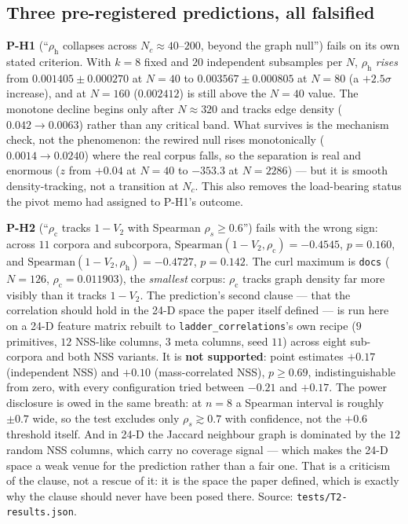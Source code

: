 \documentclass[11pt,a4paper]{article}
\theoremstyle{plain}
\theoremstyle{remark}
\theoremstyle{plain}
\begin{document}
\subsection{Three pre-registered predictions, all falsified}

\textbf{P-H1} (``$\rho_{\mathrm h}$ collapses across $N_c\approx40$--$200$, beyond the graph null'') fails on its own stated criterion. With $k=8$ fixed and $20$ independent subsamples per $N$, $\rho_{\mathrm h}$ \emph{rises} from $0.001405\pm0.000270$ at $N=40$ to $0.003567\pm0.000805$ at $N=80$ (a $+2.5\sigma$ increase), and at $N=160$ ($0.002412$) is still above the $N=40$ value. The monotone decline begins only after $N\approx320$ and tracks edge density ($0.042\to0.0063$) rather than any critical band. What survives is the mechanism check, not the phenomenon: the rewired null rises monotonically ($0.0014\to0.0240$) where the real corpus falls, so the separation is real and enormous ($z$ from $+0.04$ at $N=40$ to $-353.3$ at $N=2286$) --- but it is smooth density-tracking, not a transition at $N_c$. This also removes the load-bearing status the pivot memo had assigned to P-H1's outcome.

\textbf{P-H2} (``$\rho_{\mathrm c}$ tracks $1-V_2$ with Spearman $\rho_s\ge0.6$'') fails with the wrong sign: across $11$ corpora and subcorpora, $\mathrm{Spearman}(1-V_2,\rho_{\mathrm c})=-0.4545$, $p=0.160$, and $\mathrm{Spearman}(1-V_2,\rho_{\mathrm h})=-0.4727$, $p=0.142$. The curl maximum is \texttt{docs} ($N=126$, $\rho_{\mathrm c}=0.011903$), the \emph{smallest} corpus: $\rho_{\mathrm c}$ tracks graph density far more visibly than it tracks $1-V_2$. The prediction's second clause --- that the correlation should hold in the 24-D space the paper itself defined --- is run here on a 24-D feature matrix rebuilt to \texttt{ladder\_correlations}'s own recipe ($9$ primitives, $12$ NSS-like columns, $3$ meta columns, seed $11$) across eight sub-corpora and both NSS variants. It is \textbf{not supported}: point estimates $+0.17$ (independent NSS) and $+0.10$ (mass-correlated NSS), $p\ge0.69$, indistinguishable from zero, with every configuration tried between $-0.21$ and $+0.17$. The power disclosure is owed in the same breath: at $n=8$ a Spearman interval is roughly $\pm0.7$ wide, so the test excludes only $\rho_s\gtrsim0.7$ with confidence, not the $+0.6$ threshold itself. And in 24-D the Jaccard neighbour graph is dominated by the $12$ random NSS columns, which carry no coverage signal --- which makes the 24-D space a weak venue for the prediction rather than a fair one. That is a criticism of the clause, not a rescue of it: it is the space the paper defined, which is exactly why the clause should never have been posed there. Source: \texttt{tests/T2-results.json}.
\end{document}
